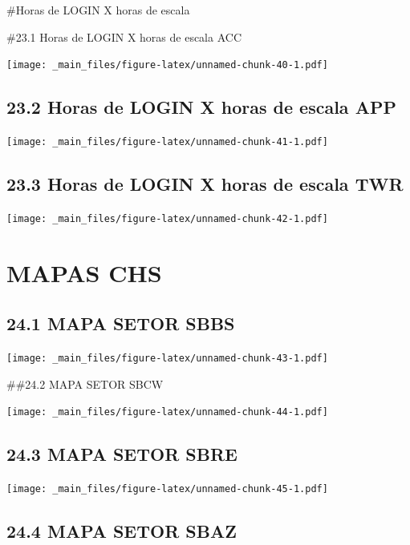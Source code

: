 \documentclass[
]{book}
\theoremstyle{definition}
\theoremstyle{definition}
\theoremstyle{definition}
\theoremstyle{definition}
\theoremstyle{remark}
\begin{document}
\#Horas de LOGIN X horas de escala

\#23.1 Horas de LOGIN X horas de escala ACC

\texttt{[image: \_main\_files/figure-latex/unnamed-chunk-40-1.pdf]}

\hypertarget{horas-de-login-x-horas-de-escala-app}{%
\section{23.2 Horas de LOGIN X horas de escala APP}\label{horas-de-login-x-horas-de-escala-app}}

\texttt{[image: \_main\_files/figure-latex/unnamed-chunk-41-1.pdf]}

\hypertarget{horas-de-login-x-horas-de-escala-twr}{%
\section{23.3 Horas de LOGIN X horas de escala TWR}\label{horas-de-login-x-horas-de-escala-twr}}

\texttt{[image: \_main\_files/figure-latex/unnamed-chunk-42-1.pdf]}

\hypertarget{mapas-chs}{%
\chapter{MAPAS CHS}\label{mapas-chs}}

\hypertarget{mapa-setor-sbbs}{%
\section{24.1 MAPA SETOR SBBS}\label{mapa-setor-sbbs}}

\texttt{[image: \_main\_files/figure-latex/unnamed-chunk-43-1.pdf]}

\#\#24.2 MAPA SETOR SBCW

\texttt{[image: \_main\_files/figure-latex/unnamed-chunk-44-1.pdf]}

\hypertarget{mapa-setor-sbre}{%
\section{24.3 MAPA SETOR SBRE}\label{mapa-setor-sbre}}

\texttt{[image: \_main\_files/figure-latex/unnamed-chunk-45-1.pdf]}

\hypertarget{mapa-setor-sbaz}{%
\section{24.4 MAPA SETOR SBAZ}\label{mapa-setor-sbaz}}
\end{document}
